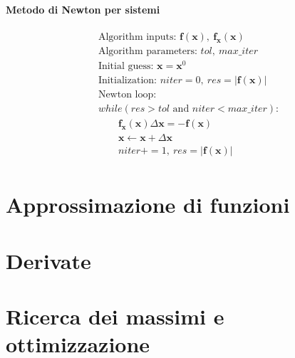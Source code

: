 \subsubsection{Metodo di Newton per sistemi}
\begin{equation}
\begin{aligned}
& \text{Algorithm inputs: } \mathbf{f}(\mathbf{x}), \ \mathbf{f}_\mathbf{x}(\mathbf{x}) \\
& \text{Algorithm parameters: } tol, \ max\_iter \\
& \text{Initial guess: } \mathbf{x} = \mathbf{x}^0 \\
& \text{Initialization: } niter = 0, \ res = |\mathbf{f}(\mathbf{x})| \\
& \text{Newton loop: } \\
& while ( res > tol \text{ and } niter < max\_iter ): \\ 
& \qquad \mathbf{f}_{\mathbf{x}}(\mathbf{x}) \Delta \mathbf{x} = - \mathbf{f}(\mathbf{x}) \\
& \qquad \mathbf{x} \leftarrow \mathbf{x} + \Delta \mathbf{x} \\
& \qquad niter += 1, \ res = |\mathbf{f}(\mathbf{x})| \\
\end{aligned}
\end{equation}

\chapter{Approssimazione di funzioni}
\section{}

\chapter{Derivate}
\section{}

\chapter{Ricerca dei massimi e ottimizzazione}
